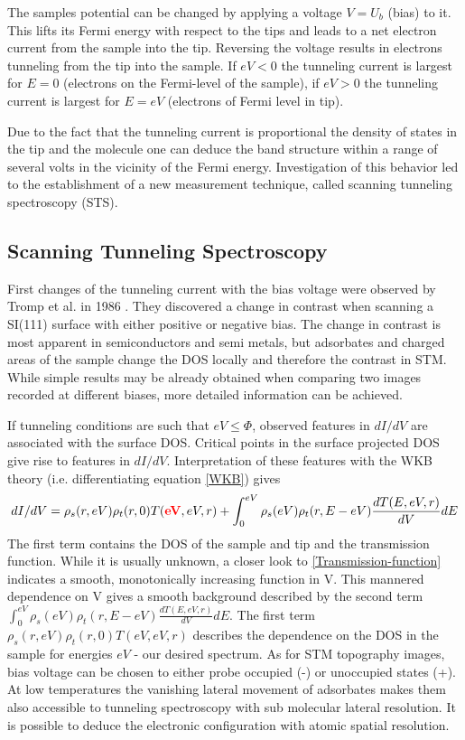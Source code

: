 The samples potential can be changed by applying a voltage $V=U_b$ (bias) to it. This lifts its Fermi energy with respect to the tips and leads to a net electron current from the sample into the tip. Reversing the voltage results in electrons tunneling from the tip into the sample. If $eV<0$ the tunneling current is largest for $E=0$ (electrons on the Fermi-level of the sample), if $eV>0$ the tunneling current is largest for $E=eV$ (electrons of Fermi level in tip).

Due to the fact that the tunneling current is proportional the density of states in the tip and the molecule one can deduce the band structure within a range of several volts in the vicinity of the Fermi energy. Investigation of this behavior led to the establishment of a new measurement technique, called scanning tunneling spectroscopy (STS).

\subsection{\textbf{S}canning \textbf{T}unneling \textbf{S}pectroscopy}
\label{section:STS}
First changes of the tunneling current with the bias voltage were observed by Tromp et al. in 1986 \cite{tromp_atomic_1986}. They discovered a change in contrast when scanning a SI(111) surface with either positive or negative bias. The change in contrast is most apparent in semiconductors and semi metals\cite{bonnell_scanning_1993}, but adsorbates and charged areas of the sample change the DOS locally and therefore the contrast in STM. While simple results may be already obtained when comparing two images recorded at different biases, more detailed information can be achieved.

If tunneling conditions are such that $eV\leq\Phi$, observed features in $dI/dV$ are associated with the surface DOS. Critical points in the surface projected DOS give rise to features in $dI/dV$. Interpretation of these features with the WKB theory (i.e. differentiating equation \eqref{WKB}) gives
$$dI/dV=\rho_s(r,eV)\rho_t(r,0)T(\textcolor{red}{\textbf{eV}},eV,r)+\int_0^{eV}\rho_s(eV)\rho_t(r,E-eV)\frac{dT(E,eV,r)}{dV}dE$$
The first term contains the DOS of the sample and tip and the transmission function. While it is usually unknown, a closer look to \eqref{Transmission-function} indicates a smooth, monotonically increasing function in V. This mannered dependence on V gives a smooth background described by the second term $\int_0^{eV}\rho_s(eV)\rho_t(r,E-eV)\frac{dT(E,eV,r)}{dV}dE$.
The first term $\rho_s(r,eV)\rho_t(r,0)T(eV,eV,r)$ describes the dependence on the DOS in the sample for energies $eV$ - our desired spectrum. As for STM topography images, bias voltage can be chosen to either probe occupied (-) or unoccupied states (+).  At low temperatures the vanishing lateral movement of adsorbates makes them also accessible to tunneling spectroscopy with sub molecular lateral resolution. It is possible to deduce the electronic configuration with atomic spatial resolution.

